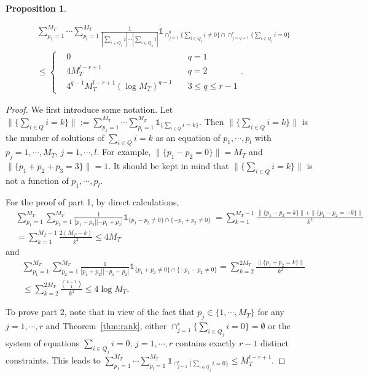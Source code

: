 \documentclass[11pt]{article}
\numberwithin{equation}{section}
\theoremstyle{plain}
\theoremstyle{definition}
\theoremstyle{definition}
\theoremstyle{assumption}
\theoremstyle{proposition}
\newtheorem{proposition}{Proposition}[section]
\theoremstyle{proposition}
\theoremstyle{example}
\theoremstyle{lemma}
\theoremstyle{theorem}
\theoremstyle{remark}
\begin{document}
\begin{proposition}
\begin{enumerate}
\begin{align*}
&\sum_{p_1=1}^{M_T}\cdots\sum_{p_l=1}^{M_T}\frac{1}{|\sum_{i\in Q_1} i|\cdots|\sum_{i\in Q_q} i|}\mathds{1}_{\cap_{j=1}^q\{\sum_{i\in Q_j} i \neq 0\}\cap\cap_{j=q+1}^{r}\{\sum_{i\in Q_j} i = 0\}} \\
&\leqslant \left\{
    \begin {aligned}
         & 0 \quad & q = 1 \\
         & 4 M_T^{l-r+1} \quad & q = 2  \\
         & 4^{q-1} M_T^{l-r+1}(\log M_T)^{q-1} \quad & 3 \leqslant q \leqslant r-1
    \end{aligned}
\right. .
\end{align*}


\end{enumerate}
\begin{proof}
We first introduce some notation. Let $\|\{\sum_{i\in Q}i = k\}\|:=\sum_{p_1=1}^{M_T}\cdots\sum_{p_l=1}^{M_T}\mathds{1}_{\{\sum_{i\in Q} i = k\}}$. Then $\|\{\sum_{i\in Q}i = k\}\|$ is the number of solutions of $\sum_{i\in Q}i = k$ as an equation of $p_1,\cdots,p_l$ with $p_j=1,\cdots,M_T$, $j=1,\cdots,l$. For example, $\|\{p_1 - p_2 = 0\}\| = M_T$ and $\|\{p_1 + p_2 + p_3 = 3\}\| = 1$. It should be kept in mind that $\|\{\sum_{i\in Q}i = k\}\|$ is not a function of $p_1,\cdots,p_l$.

For the proof of part 1, by direct calculations,
\begin{align*}
&\sum_{p_1=1}^{M_T}\sum_{p_2=1}^{M_T}\frac{1}{|p_1 - p_2||-p_1 + p_2|}\mathds{1}_{\{p_1 - p_2 \neq 0\}\cap\{-p_1 + p_2 \neq 0\}}
\
=\sum_{k=1}^{M_T-1} \frac{\|\{p_1 - p_2 = k\}\| + \|\{p_1 - p_2 = -k\}\|}{k^2}  \\
&=\sum_{k=1}^{M_T-1}\frac{2(M_T - k)}{k^2}
\leqslant 4 M_T
\end{align*}
and
\begin{align*}
&\sum_{p_1=1}^{M_T}\sum_{p_2=1}^{M_T}\frac{1}{|p_1 + p_2||-p_1 - p_2|}\mathds{1}_{\{p_1 + p_2 \neq 0\}\cap\{-p_1 - p_2 \neq 0\}}
=\sum_{k=2}^{2M_T} \frac{\|\{p_1 + p_2 = k\}\|}{k^2}  \\
&\leqslant\sum_{k=2}^{2M_T}\frac{{k-1\choose 1}}{k^2}
\leqslant 4 \log M_T .
\end{align*}

To prove part 2, note that in view of the fact that $p_j\in\{1,\cdots, M_T\}$ for any $j=1,\cdots,r$ and Theorem~\ref{thm:rank}, either $\cap_{j=1}^r\{\sum_{i\in Q_j} i = 0\} = \emptyset$ or the system of equations $\sum_{i\in Q_j} i = 0$, $j=1,\cdots,r$ contains exactly $r-1$ distinct constraints. This leads to $\sum_{p_1=1}^{M_T}\cdots\sum_{p_l=1}^{M_T}\mathds{1}_{\cap_{j=1}^r\{\sum_{i\in Q_j} i = 0\}}
\leqslant M_T^{l-r+1}$.


\end{proof}
\end{proposition}
\end{document}
